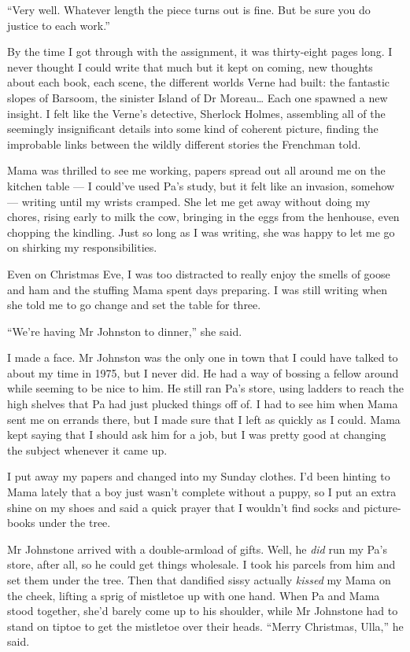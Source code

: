 ``Very well. Whatever length the piece turns out is fine. But be sure you do 
justice to each work.''

\tb

By the time I got through with the assignment, it was thirty-eight
pages long. I never thought I could write that much but it kept on
coming, new thoughts about each book, each scene, the different
worlds Verne had built: the fantastic slopes of Barsoom, the
sinister Island of Dr Moreau\ldots{} Each one spawned a new
insight. I felt like the Verne's detective, Sherlock Holmes,
assembling all of the seemingly insignificant details into some
kind of coherent picture, finding the improbable links between the
wildly different stories the Frenchman told.

Mama was thrilled to see me working, papers spread out all around
me on the kitchen table --- I could've used Pa's study, but it felt
like an invasion, somehow --- writing until my wrists cramped. She
let me get away without doing my chores, rising early to milk the
cow, bringing in the eggs from the henhouse, even chopping the
kindling. Just so long as I was writing, she was happy to let me go
on shirking my responsibilities.

Even on Christmas Eve, I was too distracted to really enjoy the
smells of goose and ham and the stuffing Mama spent days preparing.
I was still writing when she told me to go change and set the table
for three.

``We're having Mr Johnston to dinner,'' she said.

I made a face. Mr Johnston was the only one in town that I could
have talked to about my time in 1975, but I never did. He had a way
of bossing a fellow around while seeming to be nice to him. He
still ran Pa's store, using ladders to reach the high shelves that
Pa had just plucked things off of. I had to see him when Mama sent
me on errands there, but I made sure that I left as quickly as I
could. Mama kept saying that I should ask him for a job, but I was
pretty good at changing the subject whenever it came up.

I put away my papers and changed into my Sunday clothes. I'd been
hinting to Mama lately that a boy just wasn't complete without a
puppy, so I put an extra shine on my shoes and said a quick prayer
that I wouldn't find socks and picture-books under the tree.

Mr Johnstone arrived with a double-armload of gifts. Well, he
\emph{did} run my Pa's store, after all, so he could get things
wholesale. I took his parcels from him and set them under the tree.
Then that dandified sissy actually \emph{kissed} my Mama on the
cheek, lifting a sprig of mistletoe up with one hand. When Pa and
Mama stood together, she'd barely come up to his shoulder, while Mr
Johnstone had to stand on tiptoe to get the mistletoe over their
heads. ``Merry Christmas, Ulla,'' he said.

